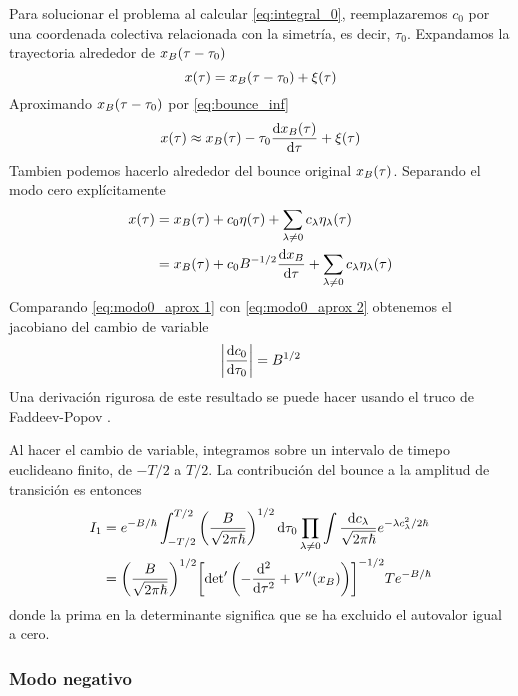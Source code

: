 \documentclass[11pt, a4paper]{article}
\numberwithin{equation}{section}
\theoremstyle{definition}
\begin{document}
Para solucionar el problema al calcular \eqref{eq:integral_0}, reemplazaremos $c_0$ por una coordenada colectiva relacionada con la simetría, es decir, $\tau_0$. %
Expandamos la trayectoria alrededor de $x_B \qty(\tau - \tau_0)$ 
\begin{equation}
x \qty(\tau) = x_B \qty(\tau - \tau_0) + \xi\qty(\tau) 
\end{equation}
Aproximando $x_B \qty(\tau - \tau_0)$ por \eqref{eq:bounce_inf}
\begin{equation} \label{eq:modo0_aprox 1}
x \qty(\tau) \approx x_B \qty(\tau) - \tau_0 \dv{x_B \qty(\tau)}{\tau} + \xi\qty(\tau)
\end{equation}
Tambien podemos hacerlo alrededor del bounce original $x_B \qty(\tau)$. Separando el modo cero explícitamente
\begin{align}
x \qty(\tau) &= x_B \qty(\tau) + c_0\eta\qty(\tau) + \sum_{\lambda \neq 0} c_\lambda\eta_\lambda\qty(\tau) \\
&= x_B \qty(\tau) + c_0 B^{-1/2} \dv{x_B}{\tau} + \sum_{\lambda \neq 0} c_\lambda\eta_\lambda\qty(\tau) \label{eq:modo0_aprox 2}
\end{align}
Comparando \eqref{eq:modo0_aprox 1} con \eqref{eq:modo0_aprox 2} obtenemos el jacobiano del cambio de variable
\begin{equation} \label{eq:jacobiano}
\qty|\dv{c_0}{\tau_0}| = B^{1/2}
\end{equation}
Una derivación rigurosa de este resultado se puede hacer usando el truco de Faddeev-Popov \cite{kleinert2009path, rubakov2009classical, andreassen2017precision}.

Al hacer el cambio de variable, integramos sobre un intervalo de timepo euclideano finito, de $-T/2$ a $T/2$. La contribución del bounce a la amplitud de transición es entonces
\begin{align}
I_1 &= e^{-B/\hbar} \int_{-T/2}^{T/2} \qty(\frac{B}{\sqrt{2\pi \hbar}})^{1/2}\dd{\tau_0} \prod_{\lambda \neq 0} \int  \frac{\dd{c_\lambda}}{\sqrt{2\pi \hbar}} e^{-\lambda c_\lambda^2/2\hbar} \\
&= \qty(\frac{B}{\sqrt{2\pi \hbar}})^{1/2} \qty[ \text{det}'\left(-\dv[2]{\tau} + V''\qty(x_B) \right) ]^{-1/2} Te^{-B/\hbar}
\end{align}
donde la prima en la determinante significa que se ha excluido el autovalor igual a cero. 

\subsubsection{Modo negativo}
\end{document}
